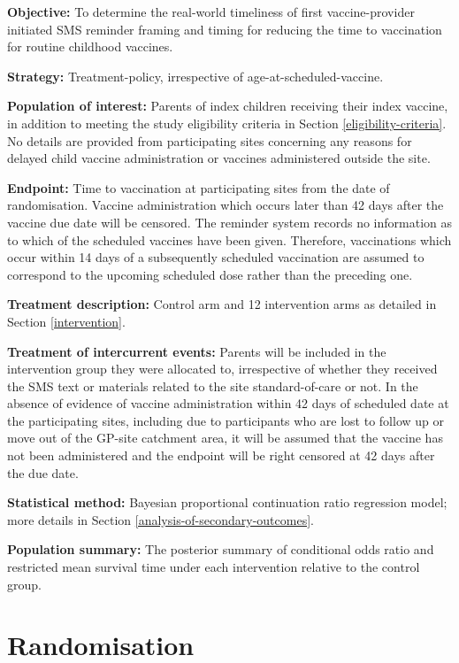 \documentclass[
  bibliography=totoc]{scrreprt}
\begin{document}
\textbf{Objective:} To determine the real-world timeliness of first vaccine-provider initiated SMS reminder framing and timing for reducing the time to vaccination for routine childhood vaccines.

\textbf{Strategy:} Treatment-policy, irrespective of age-at-scheduled-vaccine.

\textbf{Population of interest:} Parents of index children receiving their index vaccine, in addition to meeting the study eligibility criteria in Section \ref{eligibility-criteria}.
No details are provided from participating sites concerning any reasons for delayed child vaccine administration or vaccines administered outside the site.

\textbf{Endpoint:} Time to vaccination at participating sites from the date of randomisation.
Vaccine administration which occurs later than 42 days after the vaccine due date will be censored.
The reminder system records no information as to which of the scheduled vaccines have been given.
Therefore, vaccinations which occur within 14 days of a subsequently scheduled vaccination are assumed to correspond to the upcoming scheduled dose rather than the preceding one.

\textbf{Treatment description:} Control arm and 12 intervention arms as detailed in Section \ref{intervention}.

\textbf{Treatment of intercurrent events:} Parents will be included in the intervention group they were allocated to, irrespective of whether they received the SMS text or materials related to the site standard-of-care or not.
In the absence of evidence of vaccine administration within 42 days of scheduled date at the participating sites, including due to participants who are lost to follow up or move out of the GP-site catchment area, it will be assumed that the vaccine has not been administered and the endpoint will be right censored at 42 days after the due date.

\textbf{Statistical method:} Bayesian proportional continuation ratio regression model; more details in Section \ref{analysis-of-secondary-outcomes}.

\textbf{Population summary:} The posterior summary of conditional odds ratio and restricted mean survival time under each intervention relative to the control group.

\hypertarget{randomisation}{%
\section{Randomisation}\label{randomisation}}
\end{document}
